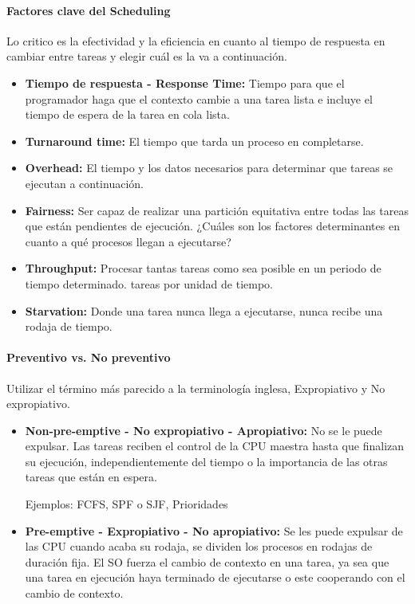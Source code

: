 \documentclass[12pt, twoside, openright]{report} %
\begin{document}
\begin{description}
	      \paragraph{Factores clave del Scheduling}
	      Lo critico es la efectividad y la eficiencia en cuanto al tiempo de respuesta en cambiar entre tareas y elegir cuál es la va a continuación.
	      \begin{itemize}
		      \item \textbf{Tiempo de respuesta - Response Time:} Tiempo para que el programador haga que el contexto cambie a una tarea lista e incluye el tiempo de espera de la tarea en cola lista.
		      \item \textbf{Turnaround time:} El tiempo que tarda un proceso en completarse.
		      \item \textbf{Overhead:} El tiempo y los datos necesarios para determinar que tareas se ejecutan a continuación.
		      \item \textbf{Fairness:} Ser capaz de realizar una partición equitativa entre todas las tareas que están pendientes de ejecución. ¿Cuáles son los factores determinantes en cuanto a qué procesos llegan a ejecutarse?
		      \item \textbf{Throughput:} Procesar tantas tareas como sea posible en un periodo de tiempo determinado. tareas por unidad de tiempo.
		      \item \textbf{Starvation:} Donde una tarea nunca llega a ejecutarse, nunca recibe una rodaja de tiempo.
	      \end{itemize}


	      \paragraph{Preventivo vs. No preventivo}

	      Utilizar el término más parecido a la terminología inglesa, Expropiativo y No expropiativo.

	      \begin{itemize}
		      \item \textbf{Non-pre-emptive - No expropiativo - Apropiativo:} No se le puede expulsar. Las tareas reciben el control de la CPU maestra hasta que finalizan su ejecución, independientemente del tiempo o la importancia de las otras tareas que están en espera.

		            Ejemplos: FCFS, SPF o SJF, Prioridades

		      \item \textbf{Pre-emptive - Expropiativo - No apropiativo:} Se les puede expulsar de las CPU cuando acaba su rodaja, se dividen los procesos en rodajas de duración fija. El SO fuerza el cambio de contexto en una tarea, ya sea que una tarea en ejecución haya terminado de ejecutarse o este cooperando con el cambio de contexto.


\end{itemize}
\end{description}
\end{document}
